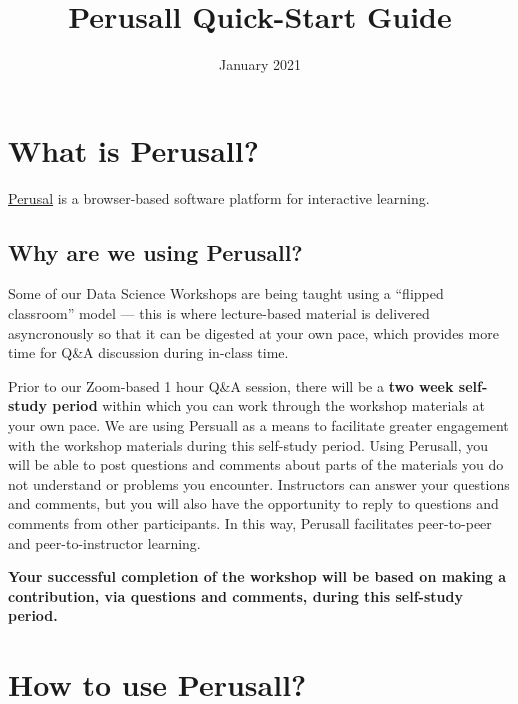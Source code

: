 \documentclass[]{book}
\title{Perusall Quick-Start Guide}
\author{}
\date{\vspace{-2.5em}January 2021}
\begin{document}
\maketitle

{
\setcounter{tocdepth}{1}
\tableofcontents
}
\hypertarget{what-is-perusall}{%
\chapter*{What is Perusall?}\label{what-is-perusall}}

\href{https://perusall.com/}{Perusal} is a browser-based software platform for interactive learning.

\hypertarget{why-are-we-using-perusall}{%
\section*{Why are we using Perusall?}\label{why-are-we-using-perusall}}

Some of our Data Science Workshops are being taught using a ``flipped classroom'' model --- this is where lecture-based material is delivered asyncronously so that it can be digested at your own pace, which provides more time for Q\&A discussion during in-class time.

Prior to our Zoom-based 1 hour Q\&A session, there will be a \textbf{two week self-study period} within which you can work through the workshop materials at your own pace. We are using Persuall as a means to facilitate greater engagement with the workshop materials during this self-study period. Using Perusall, you will be able to post questions and comments about parts of the materials you do not understand or problems you encounter. Instructors can answer your questions and comments, but you will also have the opportunity to reply to questions and comments from other participants. In this way, Perusall facilitates peer-to-peer and peer-to-instructor learning.

\textbf{Your successful completion of the workshop will be based on making a contribution, via questions and comments, during this self-study period.}

\hypertarget{how-to-use-perusall}{%
\chapter*{How to use Perusall?}\label{how-to-use-perusall}}
\end{document}
